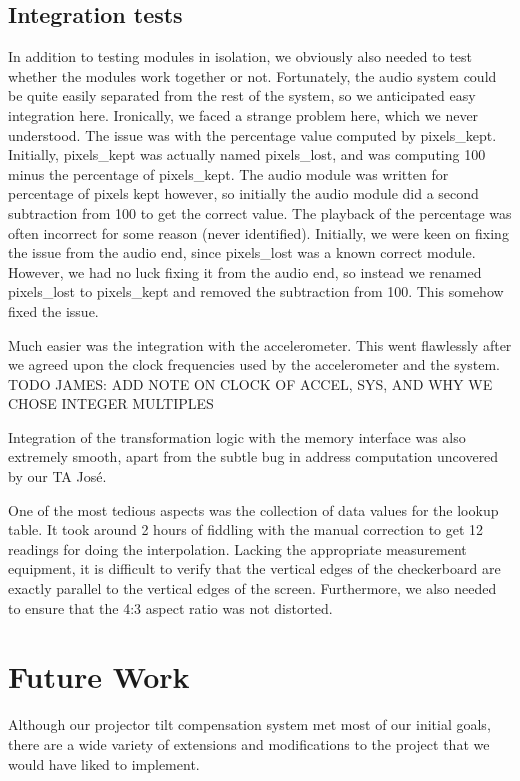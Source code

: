 \documentclass{article}
\begin{document}
\subsection{Integration tests}
In addition to testing modules in isolation, we obviously also needed to test whether the modules work together or not.
Fortunately, the audio system could be quite easily separated from the rest of the system, so we anticipated easy integration here.
Ironically, we faced a strange problem here, which we never understood.
The issue was with the percentage value computed by pixels\_kept.
Initially, pixels\_kept was actually named pixels\_lost, and was computing 100 minus the percentage of pixels\_kept.
The audio module was written for percentage of pixels kept however,
so initially the audio module did a second subtraction from 100 to get the correct value.
The playback of the percentage was often incorrect for some reason (never identified).
Initially, we were keen on fixing the issue from the audio end, since pixels\_lost was a known correct module.
However, we had no luck fixing it from the audio end, so instead we renamed pixels\_lost to pixels\_kept and removed the subtraction from 100.
This somehow fixed the issue.

Much easier was the integration with the accelerometer.
This went flawlessly after we agreed upon the clock frequencies used by the accelerometer and the system.
TODO JAMES: ADD NOTE ON CLOCK OF ACCEL, SYS, AND WHY WE CHOSE INTEGER MULTIPLES

Integration of the transformation logic with the memory interface was also extremely smooth,
apart from the subtle bug in address computation uncovered by our TA Jos\'{e}.

One of the most tedious aspects was the collection of data values for the lookup table.
It took around 2 hours of fiddling with the manual correction to get 12 readings for doing the interpolation.
Lacking the appropriate measurement equipment,
it is difficult to verify that the vertical edges of the checkerboard are exactly parallel to the vertical edges of the screen.
Furthermore, we also needed to ensure that the 4:3 aspect ratio was not distorted.

\section{Future Work}
Although our projector tilt compensation system met most of our initial goals,
there are a wide variety of extensions and modifications to the project that we would have liked to implement.
\end{document}
